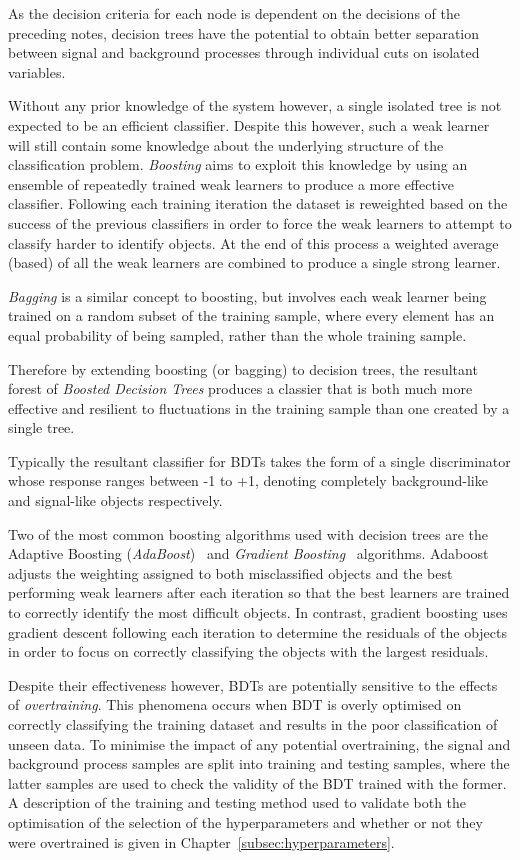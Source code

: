 As the decision criteria for each node is dependent on the decisions of the preceding notes, decision trees have the potential to obtain better separation between signal and background processes through individual cuts on isolated variables.

Without any prior knowledge of the system however, a single isolated tree is not expected to be an efficient classifier.
Despite this however, such a weak learner will still contain some knowledge about the underlying structure of the classification problem.
\emph{Boosting} aims to exploit this knowledge by using an ensemble of repeatedly trained weak learners to produce a more effective classifier.
Following each training iteration the dataset is reweighted based on the success of the previous classifiers in order to force the weak learners to attempt to classify harder to identify objects.
At the end of this process a weighted average (based) of all the weak learners are combined to produce a single strong learner.

\emph{Bagging} is a similar concept to boosting, but involves each weak learner being trained on a random subset of the training sample, where every element has an equal probability of being sampled, rather than the whole training sample.

Therefore by extending boosting (or bagging) to decision trees, the resultant forest of \emph{Boosted Decision Trees} produces a classier that is both much more effective and resilient to fluctuations in the training sample than one created by a single tree.

Typically the resultant classifier for BDTs takes the form of a single discriminator whose response ranges between -1 to +1, denoting completely background-like and signal-like objects respectively.


Two of the most common boosting algorithms used with decision trees are the Adaptive Boosting (\emph{AdaBoost})~\cite{Friedman:additivelogistic} and \emph{Gradient Boosting}~\cite{Friedman:greedyfunction,Friedman:GradientBoosting} algorithms.
Adaboost adjusts the weighting assigned to both  misclassified objects and the best performing weak learners after each iteration so that the best learners are trained to correctly identify the most difficult objects.
In contrast, gradient boosting uses gradient descent following each iteration to determine the residuals of the objects in order to focus on correctly classifying the objects with the largest residuals.

Despite their effectiveness however, BDTs are potentially sensitive to the effects of \emph{overtraining}.
This phenomena occurs when BDT is overly optimised on correctly classifying the training dataset and results in the poor classification of unseen data.
To minimise the impact of any potential overtraining, the signal and background process samples are split into training and testing samples, where the latter samples are used to check the validity of the BDT trained with the former.
A description of the training and testing method used to validate both the optimisation of the selection of the hyperparameters and whether or not they were overtrained is given in Chapter~\ref{subsec:hyperparameters}.


